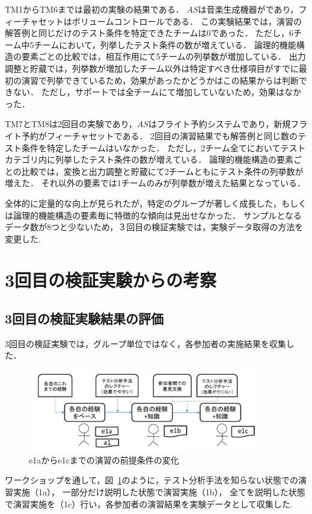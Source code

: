 TM1からTM6までは最初の実験の結果である．
$AS$は音楽生成機器がであり，フィーチャセットはボリュームコントロールである．
この実験結果では，演習の解答例と同じだけのテスト条件を特定できたチームは0であった．
ただし，6チーム中5チームにおいて，列挙したテスト条件の数が増えている．
論理的機能構造の要素ごとの比較では，相互作用にて5チームの列挙数が増加している．
出力調整と貯蔵では，列挙数が増加したチーム以外は特定すべき仕様項目がすでに最初の演習で列挙できているため，効果があったかどうかはこの結果からは判断できない．
ただし，サポートでは全チームにて増加していないため，効果はなかった．

TM7とTM8は2回目の実験であり，$AS$はフライト予約システムであり，新規フライト予約がフィーチャセットである．
2回目の演習結果でも解答例と同じ数のテスト条件を特定したチームはいなかった．
ただし，2チーム全てにおいてテストカテゴリ内に列挙したテスト条件の数が増えている．
論理的機能構造の要素ごとの比較では，変換と出力調整と貯蔵にて2チームともにテスト条件の列挙数が増えた．
それ以外の要素では1チームのみが列挙数が増えた結果となっている．

全体的に定量的な向上が見られたが，特定のグループが著しく成長した，もしくは論理的機能構造の要素毎に特徴的な傾向は見出せなかった．
サンプルとなるデータ数が8つと少ないため，３回目の検証実験では，実験データ取得の方法を変更した.

\newpage
\section{3回目の検証実験からの考察}
\subsection{3回目の検証実験結果の評価} \label{sec:3-2}

3回目の検証実験では，グループ単位ではなく，各参加者の実施結果を収集した．
\begin{figure}[h]
\begin{center}
\includegraphics[width=10cm]{./image/D-3-Fig8.png}
\caption{e1aからe1cまでの演習の前提条件の変化}
\label{fig:D-3-Fig8}
\end{center}
\end{figure}
ワークショップを通して，図~\ref{fig:D-3-Fig8}のように，テスト分析手法を知らない状態での演習実施（1a），
一部分だけ説明した状態で演習実施（1b），
全てを説明した状態で演習実施を（1c）行い，各参加者の演習結果を実験データとして収集した.


